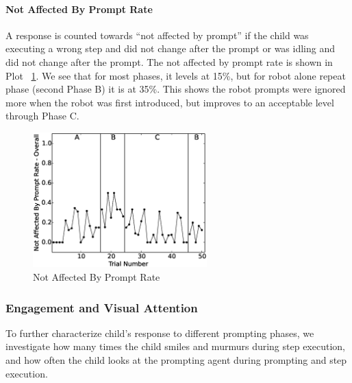 \documentclass{ut-thesis}
\begin{document}
\paragraph{Not Affected By Prompt Rate}
A response is counted towards ``not affected by prompt'' if the child was executing a wrong step and did not change after the prompt or was idling and did not change after the prompt.  The not affected by prompt rate is shown in Plot \ \ref{fig:99NotAffectedByPromptRate-Overall}.  We see that for most phases, it levels at 15\%, but for robot alone repeat phase (second Phase B) it is at 35\%.  This shows the robot prompts were ignored more when the robot was first introduced, but improves to an acceptable level through Phase C.
\begin{figure} [h]
	\centering
	\includegraphics[width=0.6\textwidth]{./img/data_analysis/99NotAffectedByPromptRate-Overall.eps}
	\caption{Not Affected By Prompt Rate}
	\label{fig:99NotAffectedByPromptRate-Overall}
\end{figure}


\subsubsection{Engagement and Visual Attention}
To further characterize child's response to different prompting phases, we investigate how many times the child smiles and murmurs during step execution, and how often the child looks at the prompting agent during prompting and step execution.
\end{document}
